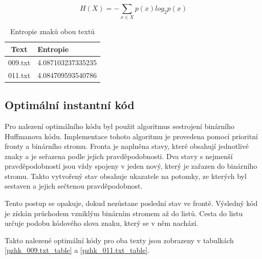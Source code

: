 \documentclass[12pt]{article}
\begin{document}
			$$ H(X) = -\sum_{x \displaystyle \in X} p(x) log_2 p(x)$$

\begin{table}[!ht]
\centering
\begin{tabular}{ | c | l | } \hline
Text	& Entropie \\ \hline
009.txt & 4.087103237335235 \\ \hline
011.txt & 4.084709593540786 \\ \hline
\end{tabular}
\caption{Entropie znaků obou textů}
\label{ent_table}
\end{table}
			
			
			
			
		\subsection{Optimální instantní kód}\label{oik}
			Pro nalezení optimálního kódu byl použit algoritmus sestrojení binárního Huﬀmanova kódu. Implementace tohoto algoritmu je provedena pomocí prioritní fronty a binárního stromu. Fronta je naplněna stavy, které obsahují jednotlivé znaky a je seřazena podle jejich pravděpodobnosti. Dva stavy s nejmenší pravděpodobností jsou vždy spojeny v jeden nový, který je zařazen do binárního stromu. Takto vytvořený stav obsahuje ukazatele na potomky, ze kterých byl sestaven a jejich sečtenou pravděpodobnost. 
			
			Tento postup se opakuje, dokud nezůstane poslední stav ve frontě. Výsledný kód je získán průchodem vzniklým binárním stromem až do listů. Cesta do listu určuje podobu kódového slova znaku, který se v něm nachází.
			
			Takto nalezené optimální kódy pro oba texty jsou zobrazeny v tabulkách \ref{pzhk_009.txt_table} a \ref{pzhk_011.txt_table}.
			
\end{document}

